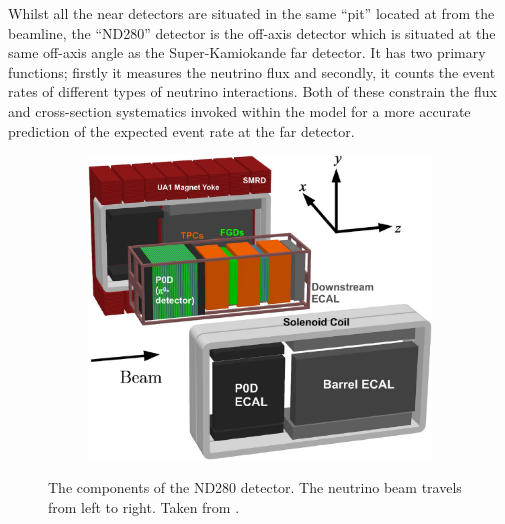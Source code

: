 Whilst all the near detectors are situated in the same ``pit'' located at  from the beamline, the ``ND280'' detector is the off-axis detector which is situated at the same off-axis angle as the Super-Kamiokande far detector. It has two primary functions; firstly it measures the neutrino flux and secondly, it counts the event rates of different types of neutrino interactions. Both of these constrain the flux and cross-section systematics invoked within the model for a more accurate prediction of the expected event rate at the far detector.

\begin{figure}[h]
  \begin{subfigure}[t]{0.7\textwidth}
    \includegraphics[width=\textwidth, trim={0mm 0mm 0mm 0mm}, clip,page=1]{Figures/Detectors/T2KND280.pdf}
  \end{subfigure}
  \caption{The components of the ND280 detector. The neutrino beam travels from left to right. Taken from \cite{t2k_det}.}
  \label{fig:T2KSKExp_T2K_ND280}
\end{figure}

